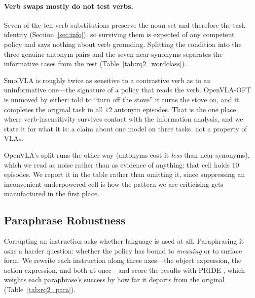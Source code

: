 \documentclass[11pt]{article}
\begin{document}
\paragraph{Verb swaps mostly do not test verbs.}
Seven of the ten verb substitutions preserve the noun set and therefore the task
identity (Section~\ref{sec:info}), so surviving them is expected of any competent
policy and says nothing about verb grounding. Splitting the condition into the three
genuine antonym pairs and the seven near-synonyms separates the informative cases
from the rest (Table~\ref{tab:rq2_wordclass}).

\begin{table}[h]
\centering
\small

\caption{Drop in TSR under verb substitution, split by whether the substitution
changes the task. Only the antonym column tests verb grounding. $n$ is episodes,
pooled over seeds.}
\label{tab:rq2_wordclass}
\end{table}

SmolVLA is roughly twice as sensitive to a contrastive verb as to an uninformative
one---the signature of a policy that reads the verb. OpenVLA-OFT is unmoved by
either: told to ``turn off the stove'' it turns the stove on, and it completes the
original task in all $12$ antonym episodes. That is the one place where
verb-insensitivity survives contact with the information analysis, and we state it
for what it is: a claim about one model on three tasks, not a property of VLAs.

OpenVLA's split runs the other way (antonyms cost it \emph{less} than
near-synonyms), which we read as noise rather than as evidence of anything: that
cell holds $10$ episodes. We report it in the table rather than omitting it, since
suppressing an inconvenient underpowered cell is how the pattern we are criticising
gets manufactured in the first place.

\subsection{Paraphrase Robustness}
\label{sec:rq2}
Corrupting an instruction asks whether language is used at all. Paraphrasing it asks
a harder question: whether the policy has bound to \emph{meaning} or to surface form.
We rewrite each instruction along three axes---the object expression, the action
expression, and both at once---and score the results with PRIDE
\citep{kim2026liberopara}, which weights each paraphrase's success by how far it
departs from the original (Table~\ref{tab:rq2_para}).
\end{document}
